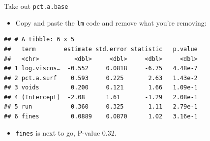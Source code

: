 \documentclass[
  ignorenonframetext,
]{beamer}
\newenvironment{Shaded}{\begin{snugshade}}{\end{snugshade}}
\newcommand{\DataTypeTok}[1]{\textcolor[rgb]{0.13,0.29,0.53}{#1}}
\newcommand{\DecValTok}[1]{\textcolor[rgb]{0.00,0.00,0.81}{#1}}
\newcommand{\FloatTok}[1]{\textcolor[rgb]{0.00,0.00,0.81}{#1}}
\newcommand{\KeywordTok}[1]{\textcolor[rgb]{0.13,0.29,0.53}{\textbf{#1}}}
\newcommand{\NormalTok}[1]{#1}
\newcommand{\OperatorTok}[1]{\textcolor[rgb]{0.81,0.36,0.00}{\textbf{#1}}}
\newcommand{\StringTok}[1]{\textcolor[rgb]{0.31,0.60,0.02}{#1}}
\providecommand{\tightlist}{%
  \setlength{\itemsep}{0pt}\setlength{\parskip}{0pt}}
\begin{document}
\begin{frame}[fragile]{Take out \texttt{pct.a.base}}
\protect\hypertarget{take-out-pct.a.base}{}

\begin{itemize}
\tightlist
\item
  Copy and paste the \texttt{lm} code and remove what you're removing:
\end{itemize}

\small

\begin{Shaded}
\end{Shaded}

\begin{verbatim}
## # A tibble: 6 x 5
##   term        estimate std.error statistic   p.value
##   <chr>          <dbl>     <dbl>     <dbl>     <dbl>
## 1 log.viscos…  -0.552     0.0818     -6.75   4.48e-7
## 2 pct.a.surf    0.593     0.225       2.63   1.43e-2
## 3 voids         0.200     0.121       1.66   1.09e-1
## 4 (Intercept)  -2.08      1.61       -1.29   2.08e-1
## 5 run           0.360     0.325       1.11   2.79e-1
## 6 fines         0.0889    0.0870      1.02   3.16e-1
\end{verbatim}

\normalsize

\begin{itemize}
\tightlist
\item
  \texttt{fines} is next to go, P-value 0.32.
\end{itemize}

\end{frame}
\end{document}
